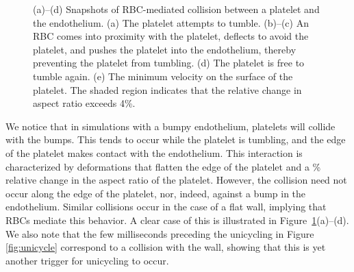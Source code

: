 \begin{figure}[th!]
    \vspace{11pt}

    \begin{subfigure}[t]{\textwidth}
    \end{subfigure}
    \caption[RBC-mediated platelet-endothelial collision]{%
(a)--(d) Snapshots of RBC-mediated collision between a platelet and the endothelium. (a)
The platelet attempts to tumble. (b)--(c) An RBC comes into proximity with the platelet,
deflects to avoid the platelet, and pushes the platelet into the endothelium, thereby
preventing the platelet from tumbling. (d) The platelet is free to tumble again. (e) The
minimum velocity on the surface of the platelet. The shaded region indicates that the
relative change in aspect ratio exceeds 4\%.
    }\label{fig:rbc-plt-endo-collision}
\end{figure}

We notice that in simulations with a bumpy endothelium, platelets will collide with the
bumps. This tends to occur while the platelet is tumbling, and the edge of the platelet
makes contact with the endothelium. This interaction is characterized by deformations
that flatten the edge of the platelet and a \% relative
change in the aspect ratio of the platelet. However, the collision need not occur along
the edge of the platelet, nor, indeed, against a bump in the endothelium. Similar
collisions occur in the case of a flat wall, implying that RBCs mediate this behavior. A
clear case of this is illustrated in Figure~\ref{fig:rbc-plt-endo-collision}(a)--(d).
We also note that the few milliseconds preceding the unicycling in Figure~%
\ref{fig:unicycle} correspond to a collision with the wall, showing that this is yet
another trigger for unicycling to occur.


